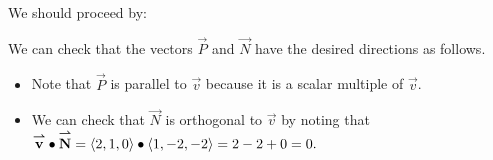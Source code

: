\documentclass{ximera}
\begin{document}
\begin{exercise}
\begin{exercise}
\begin{hint}
 We should proceed by:
 
 \begin{multipleChoice}
 \end{multipleChoice}
 \end{hint}
 
 \begin{feedback}[correct] We can check that the vectors $\vec{P}$ and $\vec{N}$ have the desired directions as follows.
 \begin{itemize}
 \item  Note that $\vec{P}$ is parallel to $\vec{v}$ because it is a scalar multiple of $\vec{v}$. 
 \item We can check that $\vec{N}$ is orthogonal to $\vec{v}$ by noting that ${\overset{\boldsymbol{\rightharpoonup}}{\mathbf{v}}} \bullet {\overset{\boldsymbol{\rightharpoonup}}{\mathbf{N}}} =  \left\langle 2,1,0\right\rangle \bullet \left\langle 1,-2,-2\right\rangle = 2-2+0=0.$
 \end{itemize}
 \end{feedback}
\end{exercise}
\end{exercise}
\end{document}
